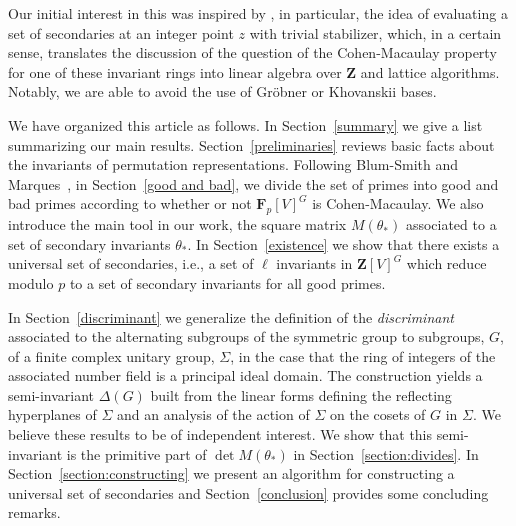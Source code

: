 \documentclass[12pt]{amsart}
\newcommand{\ZZ}{\mathbf{Z}} %
\newcommand{\FF}{\mathbf{F}} %
\newcommand{\ZZ}{\mathbb{Z}} %
\newcommand{\FF}{\mathbb{F}} %
\theoremstyle{definition}
\newcommand{\david}[1]{\textcolor{blue}{David: #1}}
\newcommand{\bth}{{{\theta_*}}} %
\begin{document}
Our initial interest in this was inspired by \cite{BT}, in particular, the idea of evaluating a set of secondaries at an integer point $z$ with trivial stabilizer, which, in a certain sense, translates the discussion of the question of the Cohen-Macaulay property for one of these invariant rings into linear algebra over $\ZZ$ and lattice algorithms.  Notably, we are able to avoid the use of Gr\"obner or Khovanskii bases.

We have organized this article as follows.
  In Section~\ref{summary} we give a list summarizing our main results.
Section~\ref{preliminaries} reviews basic facts about the invariants of permutation representations.   
Following Blum-Smith and Marques~\cite{BenandSophie}, 
in Section~\ref{good and bad}, we
divide the set of primes into good and bad primes according to whether 
or not $\FF_p[V]^G$ is Cohen-Macaulay.  
We also introduce the main tool in our work, the square matrix $M(\bth)$
associated to a set of secondary invariants $\bth$.   
In Section~\ref{existence} we 
show that there exists a universal set of secondaries, i.e., a set of $\ell$ invariants in $\ZZ[V]^G$ which
reduce modulo $p$ to a set of secondary invariants for all good primes.


In Section~\ref{discriminant} we generalize the definition of the {\em discriminant} associated
to the alternating subgroups of 
the symmetric group to subgroups, $G$, of a finite complex unitary group, $\Sigma$, in the case that the ring of integers of the associated number field is a principal ideal domain.  The construction yields a semi-invariant $\Delta(G)$ built from the linear forms defining the reflecting hyperplanes of $\Sigma$ and an analysis of the action of $\Sigma$ on the cosets of $G$ in $\Sigma$.  We believe these results to be of independent interest.  We show that this semi-invariant is the primitive part of $\det M(\bth)$ in Section~\ref{section:divides}.  In Section~\ref{section:constructing}  we present an algorithm for constructing a universal set of secondaries and Section~\ref{conclusion} provides some concluding remarks. 

\end{document}
